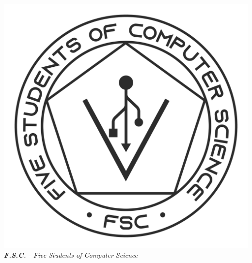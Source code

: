 \begin{titlepage}
		\clearpage
		\vspace*{\fill}
		\includegraphics[height=0.6\textwidth]{Logo_FSC_WhiteBg}\\[0.5cm]
		\textit{\textbf{F.S.C.} - Five Students of Computer Science}
		
		\vspace*{\fill}
		
	\end{titlepage}